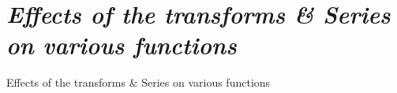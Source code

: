 \documentclass[12pt, a4paper]{report}
\begin{document}
        
        
        
        
        
        
        
        
        
        
        
        
\chapter{\textit{Effects of the transforms \& Series on various functions}}
        
        {Effects of the transforms & Series on various functions}        
        
        
\end{document}

